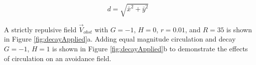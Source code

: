 \documentclass[conf]{new-aiaa}
\begin{document}
\begin{equation}
\label{eq:range}
d = \sqrt{ \bar{x}^2+\bar{y}^2}
\end{equation}

A strictly repulsive field $\overrightarrow{V}_{obst}$ with $G=-1$, $H=0$, $r=0.01$, and $R = 35$ is shown in Figure \ref{fig:decayApplied}a. Adding equal magnitude circulation and decay $G=-1$, $H=1$ is shown in Figure \ref{fig:decayApplied}b to demonstrate the effects of circulation on an avoidance field.


%
%
%
%
%
%
%
%
%
%

\end{document}
